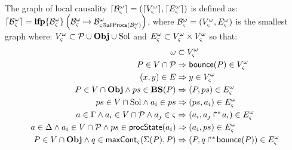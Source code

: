 \begin{definition}
\label{def:glc}
  The graph of local causality $\cwB = (\Bv, \Be)$ is defined as: $\cwB = \lfp{\aB^\w_\ctx}{\myB}{\aB^\w_{\ctx \Cap \allprocs(\myB)}}$,
  where $\myB = (\cwV, \cwE)$ is the smallest graph where:
  $\cwV \subset \Proc \cup \Obj \cup \Sol$ and $\cwE \subset \cwV \times \cwV$
  so that:
  \begin{align}
    \w &\subset \cwV \label{eq:Vw} \\
    P \in \VProc &\Rightarrow \PHbounce(P) \in \cwV \label{eq:Vproc} \\
    (x, y) \in \E &\Rightarrow y \in \cwV \label{eq:VE} \\
    P \in \VObj \wedge ps \in \BS(P) &\Rightarrow (P, ps) \in \cwE \label{eq:ESol1} \\
    ps \in \VSol \wedge a_i \in ps &\Rightarrow (ps, a_i) \in \cwE \label{eq:ESol2} \\
    a \in \components \wedge a_i \in \VProc \wedge a_j \in \ctx &\Rightarrow (a_i, \PHobjp{a}{j}{i}) \in \cwE \label{eq:EReq} \\
    a \in \cs \wedge a_i \in \VProc \wedge ps \in \csState(a_i) &\Rightarrow (a_i, ps) \in \cwE \label{eq:EPrio} \\
    P \in \VObj \wedge q \in \gCont_\ctx(\PHsort(P), P) &\Rightarrow (P, \PHobj{q}{\PHbounce(P)}) \in \cwE \label{eq:ECont}
  \end{align}
\end{definition}

